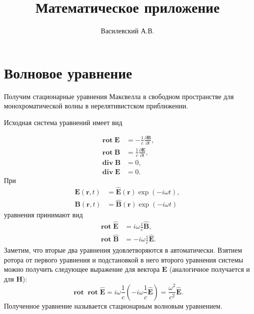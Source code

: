 \documentclass[12pt,a4paper]{article}
\title{Математическое приложение}
\author{Василевский А.В.}
\DeclareMathOperator{\Rot}{\mathbf{rot}}
\DeclareMathOperator{\Div}{\mathbf{div}}
\newcommand{\V}[1]{\mathbf{#1}}
\begin{document}
    \maketitle
    \tableofcontents

    \appendix


    \section{Волновое уравнение}

        Получим стационарные уравнения Максвелла в свободном пространстве для монохроматической волны в нерелятивистском приближении.

        Исходная система уравнений имеет вид

        \begin{equation}\begin{aligned}\label{eq:maxwell_empty_space}
            \Rot\V{E} &= - \frac{1}{c} \frac{\partial \V{B}}{\partial t}, \\
            \Rot\V{B} &= \frac{1}{c} \frac{\partial \V{E}}{\partial t}, \\
            \Div\V{B} &= 0, \\
            \Div\V{E} &= 0.
        \end{aligned}\end{equation}
        При
        \begin{equation}\begin{aligned}
            \V{E}(\V{r}, t) &= \V{\hat{E}}(\V{r}) \exp(- i \omega t), \\
            \V{B}(\V{r}, t) &= \V{\hat{B}}(\V{r}) \exp(- i \omega t)
        \end{aligned}\end{equation}
        уравнения принимают вид
        \begin{equation}\begin{aligned}
            \Rot\V{\hat{E}} &= i \omega \frac{1}{c} \V{\hat{B}}, \\
            \Rot\V{\hat{B}} &= - i \omega \frac{1}{c} \V{\hat{E}}.
        \end{aligned}\end{equation}
        Заметим, что вторые два уравнения удовлетворяются в автоматически. Взятием ротора от первого уравнения и подстановкой в него второго уравнения системы можно получить следующее выражение для вектора $\V{E}$ (аналогичное получается и для $\V{H}$):
        \begin{equation}
            \Rot\Rot{\V{\hat{E}}} = i \omega \frac{1}{c} \left( -i \omega \frac{1}{c} \V{\hat{E}} \right) = \frac{\omega^2}{c^2} \V{\hat{E}}.
        \end{equation}
        Полученное уравнение называется стационарным волновым уравнением.
\end{document}
